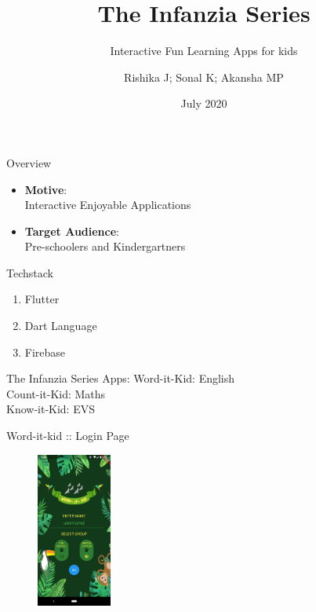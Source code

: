 \documentclass[14pt]{beamer}
\title[SlideSpeak]{The Infanzia Series}
\subtitle{Interactive Fun Learning Apps for kids}
\author[Team 16]{Rishika J; Sonal K; Akansha MP}
\date{July 2020}
\begin{document}
\begin{frame}
    \titlepage
\end{frame}

\begin{frame}{Overview}
    \pause
    \begin{itemize}
    \item \textbf{Motive}: \\
            Interactive Enjoyable Applications
        \pause
    \item \textbf{Target Audience}: \\
            Pre-schoolers and Kindergartners
    \end{itemize}
\end{frame}

\begin{frame}{Techstack}
    \pause
    \begin{enumerate}
        \item Flutter
        \item Dart Language
        \item Firebase  
    \end{enumerate}
\end{frame}

\begin{frame}[standout]
    The Infanzia Series Apps: 
    \pause
    \alert{Word-it-Kid: English} \\
    \pause
    \alert{Count-it-Kid: Maths} \\
    \pause
    \alert{Know-it-Kid: EVS} 
\end{frame}

\begin{frame}{Word-it-kid :: Login Page}
    \begin{figure}[ht]
        \includegraphics[height=2in]{LogIn.jpeg}
    \end{figure}
\end{frame}
\end{document}
